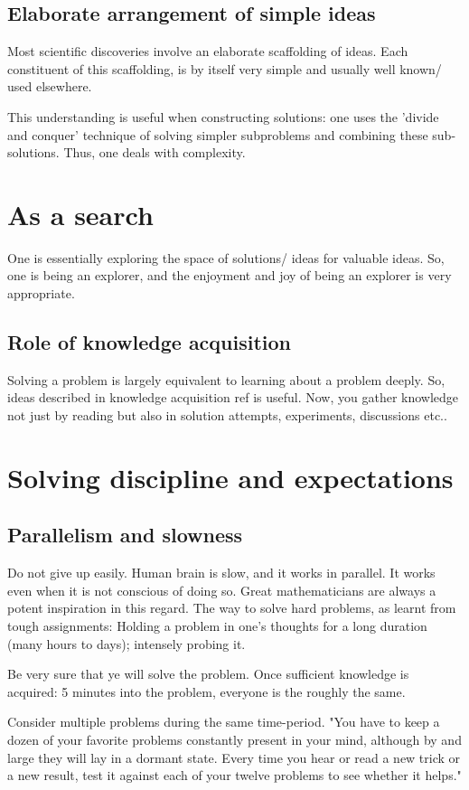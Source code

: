 \documentclass[oneside, article]{memoir}
\begin{document}
\subsection{Elaborate arrangement of simple ideas}
Most scientific discoveries involve an elaborate scaffolding of ideas. Each constituent of this scaffolding, is by itself very simple and usually well known/ used elsewhere.

This understanding is useful when constructing solutions: one uses the 'divide and conquer' technique of solving simpler subproblems and combining these sub-solutions. Thus, one deals with complexity.

\section{As a search}
One is essentially exploring the space of solutions/ ideas for valuable ideas. So, one is being an explorer, and the enjoyment and joy of being an explorer is very appropriate.

\subsection{Role of knowledge acquisition}
Solving a problem is largely equivalent to learning about a problem deeply. So, ideas described in knowledge acquisition ref is useful. Now, you gather knowledge not just by reading but also in solution attempts, experiments, discussions etc..

\section{Solving discipline and expectations}
\subsection{Parallelism and slowness}
Do not give up easily. Human brain is slow, and it works in parallel. It works even when it is not conscious of doing so. Great mathematicians are always a potent inspiration in this regard. The way to solve hard problems, as learnt from tough assignments: Holding a problem in one's thoughts for a long duration (many hours to days); intensely probing it.

Be very sure that ye will solve the problem. Once sufficient knowledge is acquired: 5 minutes into the problem, everyone is the roughly the same.

Consider multiple problems during the same time-period. "You have to keep a dozen of your favorite problems constantly present in your mind, although by and large they will lay in a dormant state. Every time you hear or read a new trick or a new result, test it against each of your twelve problems to see whether it helps."
\end{document}
